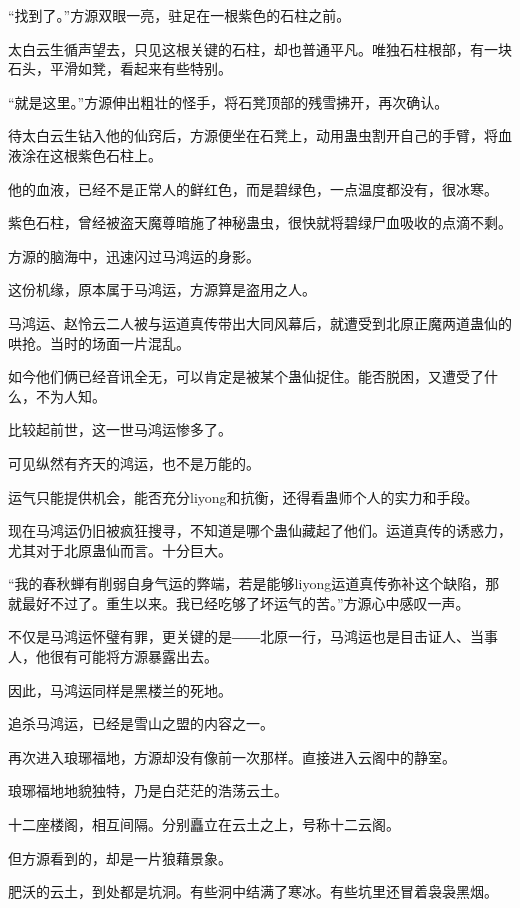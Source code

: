 
\begin{this_body}

“找到了。”方源双眼一亮，驻足在一根紫色的石柱之前。

太白云生循声望去，只见这根关键的石柱，却也普通平凡。唯独石柱根部，有一块石头，平滑如凳，看起来有些特别。

“就是这里。”方源伸出粗壮的怪手，将石凳顶部的残雪拂开，再次确认。

待太白云生钻入他的仙窍后，方源便坐在石凳上，动用蛊虫割开自己的手臂，将血液涂在这根紫色石柱上。

他的血液，已经不是正常人的鲜红色，而是碧绿色，一点温度都没有，很冰寒。

紫色石柱，曾经被盗天魔尊暗施了神秘蛊虫，很快就将碧绿尸血吸收的点滴不剩。

方源的脑海中，迅速闪过马鸿运的身影。

这份机缘，原本属于马鸿运，方源算是盗用之人。

马鸿运、赵怜云二人被与运道真传带出大同风幕后，就遭受到北原正魔两道蛊仙的哄抢。当时的场面一片混乱。

如今他们俩已经音讯全无，可以肯定是被某个蛊仙捉住。能否脱困，又遭受了什么，不为人知。

比较起前世，这一世马鸿运惨多了。

可见纵然有齐天的鸿运，也不是万能的。

运气只能提供机会，能否充分liyong和抗衡，还得看蛊师个人的实力和手段。

现在马鸿运仍旧被疯狂搜寻，不知道是哪个蛊仙藏起了他们。运道真传的诱惑力，尤其对于北原蛊仙而言。十分巨大。

“我的春秋蝉有削弱自身气运的弊端，若是能够liyong运道真传弥补这个缺陷，那就最好不过了。重生以来。我已经吃够了坏运气的苦。”方源心中感叹一声。

不仅是马鸿运怀璧有罪，更关键的是――北原一行，马鸿运也是目击证人、当事人，他很有可能将方源暴露出去。

因此，马鸿运同样是黑楼兰的死地。

追杀马鸿运，已经是雪山之盟的内容之一。

再次进入琅琊福地，方源却没有像前一次那样。直接进入云阁中的静室。

琅琊福地地貌独特，乃是白茫茫的浩荡云土。

十二座楼阁，相互间隔。分别矗立在云土之上，号称十二云阁。

但方源看到的，却是一片狼藉景象。

肥沃的云土，到处都是坑洞。有些洞中结满了寒冰。有些坑里还冒着袅袅黑烟。


\end{this_body}

